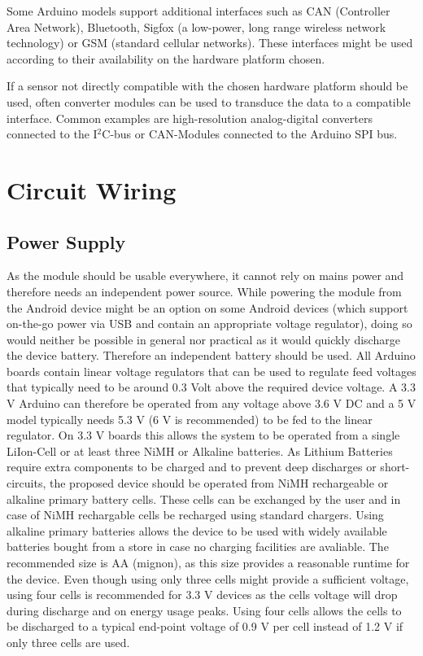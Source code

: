 Some Arduino models support additional interfaces such as CAN (Controller Area Network), Bluetooth, Sigfox (a low-power, long range wireless network technology) or GSM (standard cellular networks). These interfaces might be used according to their availability on the hardware platform chosen. 

If a sensor not directly compatible with the chosen hardware platform should be used, often converter modules can be used to transduce the data to a compatible interface. Common examples are high-resolution analog-digital converters connected to the I$^2$C-bus or CAN-Modules connected to the Arduino SPI bus.

\section{Circuit Wiring}
\subsection{Power Supply}
As the module should be usable everywhere, it cannot rely on mains power and therefore needs an independent power source. While powering the module from the Android device might be an option on some Android devices (which support on-the-go power via USB and contain an appropriate voltage regulator), doing so would neither be possible in general nor practical as it would quickly discharge the device battery. Therefore an independent battery should be used. All Arduino boards contain linear voltage regulators that can be used to regulate feed voltages that typically need to be around 0.3 Volt above the required device voltage. A 3.3 V Arduino can therefore be operated from any voltage above 3.6 V DC and a 5 V model typically needs 5.3 V (6 V is recommended) to be fed to the linear regulator. On 3.3 V boards this allows the system to be operated from a single LiIon-Cell or at least three NiMH or Alkaline batteries. As Lithium Batteries require extra components to be charged and to prevent deep discharges or short-circuits, the proposed device should be operated from NiMH rechargeable or alkaline primary battery cells. These cells can be exchanged by the user and in case of NiMH rechargable cells be recharged using standard chargers. Using alkaline primary batteries allows the device to be used with widely available batteries bought from a store in case no charging facilities are avaliable. The recommended size is AA (mignon), as this size provides a reasonable runtime for the device. Even though using only three cells might provide a sufficient voltage, using four cells is recommended for 3.3 V devices as the cells voltage will drop during discharge and on energy usage peaks. Using four cells allows the cells to be discharged to a typical end-point voltage of 0.9 V per cell instead of 1.2 V if only three cells are used.

